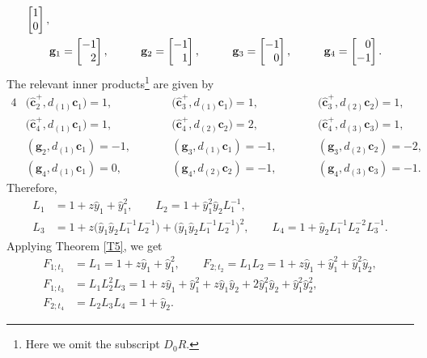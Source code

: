 \documentclass[pdftex]{sigma}
\numberwithin{equation}{section}
\begin{document}
\begin{Example}
\begin{alignat*}{5}
\begin{bmatrix}
 1\\0
 \end{bmatrix},&\\
 &\mathbf{g}_{1}=\begin{bmatrix}
 -1\\\hphantom{-}2
 \end{bmatrix},\qquad&&
 \mathbf{g}_{2}=\begin{bmatrix}
 -1\\\hphantom{-}1
 \end{bmatrix},\qquad&&
 \mathbf{g}_{3}=\begin{bmatrix}
 -1\\\hphantom{-}0
 \end{bmatrix},\qquad&&
 \mathbf{g}_{4}=\begin{bmatrix}
 \hphantom{-}0\\-1
 \end{bmatrix}.&
 \end{alignat*}
The relevant inner products\footnote{Here we omit the subscript $D_0R$.} are given by
\begin{alignat*}{4}
&\bigl(\mathbf{\hat{c}}_2^+,d_{(1)}\mathbf{c}_{1}\bigr)=1,\qquad &&\bigl(\mathbf{\hat{c}}_3^+,d_{(1)}\mathbf{c}_{1}\bigr)=1,\qquad && \bigl(\mathbf{\hat{c}}_3^+,d_{(2)}\mathbf{c}_{2}\bigr)=1,&\\
 &\bigl(\mathbf{\hat{c}}_4^+,d_{(1)}\mathbf{c}_{1}\bigr)=1,\qquad&&
 \bigl(\mathbf{\hat{c}}_4^+,d_{(2)}\mathbf{c}_{2}\bigr)=2,\qquad&&
\bigl(\mathbf{\hat{c}}_4^+,d_{(3)}\mathbf{c}_{3}\bigr)=1,&\\
 &(\mathbf{g}_{2},d_{(1)}\mathbf{c}_{1})=-1,\qquad&&
 (\mathbf{g}_{3},d_{(1)}\mathbf{c}_{1})=-1,\qquad&&
 (\mathbf{g}_{3},d_{(2)}\mathbf{c}_{2})=-2,&\\
 &(\mathbf{g}_{4},d_{(1)}\mathbf{c}_{1})=0,\qquad&&
 (\mathbf{g}_{4},d_{(2)}\mathbf{c}_{2})=-1,\qquad&&
 (\mathbf{g}_{4},d_{(3)}\mathbf{c}_{3})=-1.&
 \end{alignat*}
 Therefore,
 \begin{align*}
 L_1&=1+z\hat{y}_1+\hat{y}_1^2,\qquad
 L_2=1+\hat{y}_1^2\hat{y}_2L_1^{-1},\\
 L_3&=1+z\bigl(\hat{y}_1\hat{y}_2L_1^{-1}L_2^{-1}\bigr)+\bigl(\hat{y}_1\hat{y}_2L_1^{-1}L_2^{-1}\bigr)^2,\qquad
 L_4=1+\hat{y}_2L_1^{-1}L_2^{-2}L_{3}^{-1}.
 \end{align*}
 Applying Theorem \ref{T5}, we get
 \begin{align*}
 F_{1;t_1}&=L_1
 =1+z\hat{y}_1+\hat{y}_1^2,\qquad
 F_{2;t_2}=L_1L_2=1+z\hat{y}_1+\hat{y}_1^2+\hat{y}_1^2\hat{y}_2,\\
 F_{1;t_3}&=L_1L_2^2L_3=1+z\hat{y}_1+\hat{y}_1^2+z\hat{y}_1\hat{y}_2+2\hat{y}_1^2\hat{y}_2+\hat{y}_1^2\hat{y}_2^2,\\
 F_{2;t_4}&=L_2L_3L_4
 =1+\hat{y}_2.
\end{align*}
\end{Example}
\end{document}
